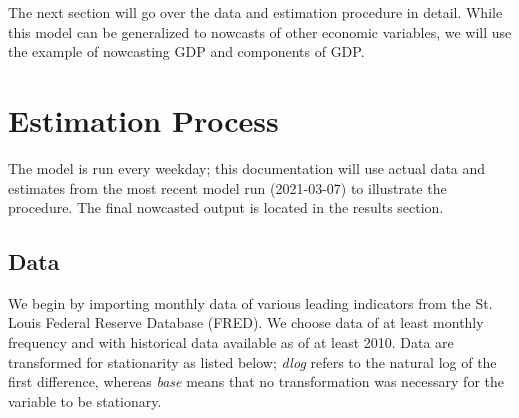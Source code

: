 \documentclass[11pt, letterpaper]{article}\usepackage[]{graphicx}\usepackage[]{color}
\begin{document}
The next section will go over the data and estimation procedure in detail. While this model can be generalized to nowcasts of other economic variables, we will use the example of nowcasting GDP and components of GDP.

\newpage
\section{Estimation Process}
The model is run every weekday; this documentation will use actual data and estimates from the most recent model run (2021-03-07) to illustrate the procedure. The final nowcasted output is located in the results section.

\subsection{Data}
We begin by importing monthly data of various leading indicators from the St. Louis Federal Reserve Database (FRED). We choose data of at least monthly frequency and with historical data available as of at least 2010. Data are transformed for stationarity as listed below; \textit{dlog} refers to the natural log of the first difference, whereas \textit{base} means that no transformation was necessary for the variable to be stationary.
\end{document}
